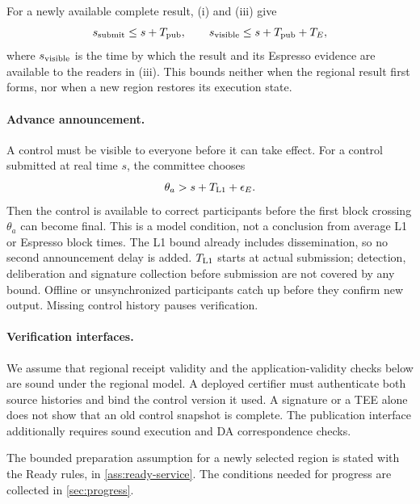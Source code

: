 \documentclass[11pt,a4paper]{article}
\begin{document}
For a newly available complete result, (i) and (iii) give
\[
 s_{\rm submit}\le s+T_{\rm pub},\qquad
 s_{\rm visible}\le s+T_{\rm pub}+T_E,
\]
where $s_{\rm visible}$ is the time by which the result and its Espresso
evidence are available to the readers in (iii). This bounds neither when
the regional result first forms, nor when a new region restores its
execution state.

\paragraph{Advance announcement.}
A control must be visible to everyone before it can take effect.
For a control submitted at real time $s$, the committee chooses
\[
 \theta_a>s+T_{\rm L1}+\epsilon_E.
\]
Then the control is available to correct participants before the first
block crossing $\theta_a$ can become final. This is a model condition,
not a conclusion from average L1 or Espresso block times. The L1 bound
already includes dissemination, so no second announcement delay is
added. $T_{\rm L1}$ starts at actual submission; detection, deliberation
and signature collection before submission are not covered by any
bound. Offline or unsynchronized participants catch up before they
confirm new output. Missing control history pauses verification.

\paragraph{Verification interfaces.}
We assume that regional receipt validity and the application-validity
checks below are sound under the regional model. A deployed certifier
must authenticate both source histories and bind the control version it
used. A signature or a TEE alone does not show that an old control
snapshot is complete. The publication interface additionally requires
sound execution and DA correspondence checks.

The bounded preparation assumption for a newly selected region is
stated with the Ready rules, in \cref{ass:ready-service}. The conditions
needed for progress are collected in \cref{sec:progress}.
\end{document}
